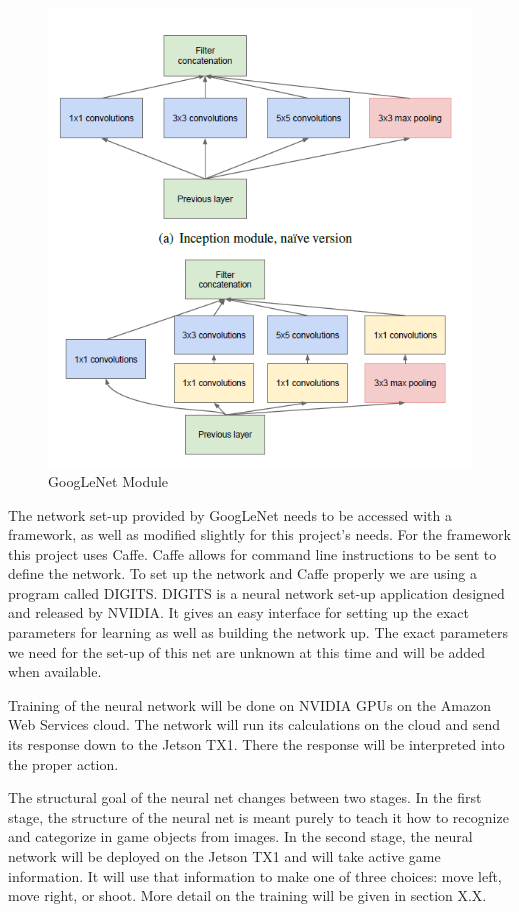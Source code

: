 \documentclass{scrreprt}
\begin{document}
\begin{figure}
  \includegraphics[natwidth=100,natheight=85]{GoogLeNetModule.png}
  \caption{GoogLeNet Module}
  \label{fig:3.1}
\end{figure}

The network set-up provided by GoogLeNet needs to be accessed with a framework, as well as modified slightly for this project's needs.
For the framework this project uses Caffe.
Caffe allows for command line instructions to be sent to define the network.
To set up the network and Caffe properly we are using a program called DIGITS.
DIGITS is a neural network set-up application designed and released by NVIDIA.
It gives an easy interface for setting up the exact parameters for learning as well as building the network up.
The exact parameters we need for the set-up of this net are unknown at this time and will be added when available.

Training of the neural network will be done on NVIDIA GPUs on the Amazon Web Services cloud.
The network will run its calculations on the cloud and send its response down to the Jetson TX1.
There the response will be interpreted into the proper action.

The structural goal of the neural net changes between two stages.
In the first stage, the structure of the neural net is meant purely to teach it how to recognize and categorize in game objects from images.
In the second stage, the neural network will be deployed on the Jetson TX1 and will take active game information.
It will use that information to make one of three choices: move left, move right, or shoot.
More detail on the training will be given in section X.X.
\end{document}
